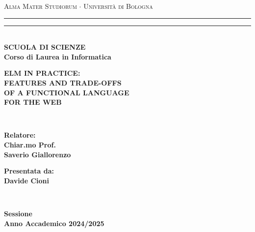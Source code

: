 \begin{titlepage}
    \begin{center}
        {{\Large{\textsc{Alma Mater Studiorum $\cdot$ Università di Bologna}}}}
        \rule[0.1cm]{\textwidth}{0.1mm}
        \rule[0.5cm]{\textwidth}{0.6mm}\\
        {\small{\bf SCUOLA DI SCIENZE\\
            Corso di Laurea in Informatica}}
    \end{center}

    \vspace{25mm}

    \begin{center}
        {\LARGE{\bf ELM IN PRACTICE: }}\\
        \vspace{3mm}
        {\LARGE{\bf FEATURES AND TRADE-OFFS }}\\
        \vspace{3mm}
        {\LARGE{\bf OF A FUNCTIONAL LANGUAGE }}\\
        \vspace{3mm}
        {\LARGE{\bf FOR THE WEB }}\\
    \end{center}

    \vspace{60mm}
    \par
    \noindent
    \begin{minipage}[t]{0.04\textwidth}
        ~
    \end{minipage}
    \begin{minipage}[t]{0.4\textwidth}
        \large{\bf Relatore:\\
            Chiar.mo Prof.\\
            Saverio Giallorenzo}
        \vspace{3mm}\\
    \end{minipage}
    \hfill
    \begin{minipage}[t]{0.4\textwidth}\raggedleft
        {\large{\bf Presentata da:\\
                Davide Cioni}}
    \end{minipage}
    \begin{minipage}[t]{0.04\textwidth}
        ~
    \end{minipage}

    \vspace{30mm}

    \begin{center}
        {\large{\bf {} Sessione\\
                Anno Accademico 2024/2025 }}
    \end{center}
\end{titlepage}
